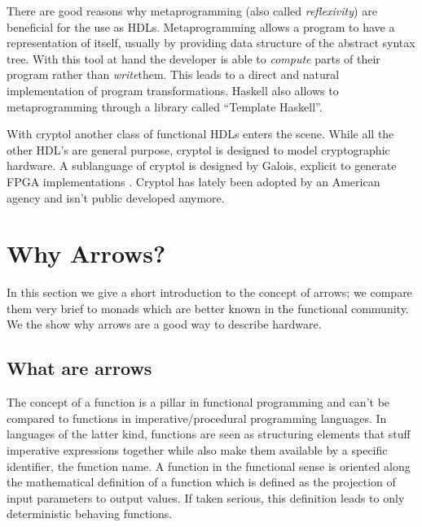 \documentclass{article}
\begin{document}
\par
There are good reasons why metaprogramming (also called \emph{reflexivity}) are beneficial for the use as HDLs. Metaprogramming allows a
program to have a representation of itself, usually by providing data structure of the abstract syntax tree. With this tool at hand the
developer is able to \emph{compute} parts of their program rather than \emph{write}them. This leads to a direct and natural implementation
of program transformations. Haskell also allows to metaprogramming through a library called ``Template Haskell''\cite{haskell:template}. 

\par
With cryptol\cite{cryptol:programming} another class of functional HDLs enters the scene. While all the other HDL's are general purpose,
cryptol is designed to model cryptographic hardware. A sublanguage of cryptol is designed by Galois, explicit to generate FPGA
implementations \cite{cryptol:fpga}. Cryptol has lately been adopted by an American agency and isn't public developed anymore.


\section{Why Arrows?}
In this section we give a short introduction to the concept of arrows; we compare them very brief to monads which are better known in the
functional community. We the show why arrows are a good way to describe hardware. 

\subsection{What are arrows}
The concept of a function is a pillar in functional programming and can't be compared to functions in imperative/procedural programming
languages. In languages of the latter kind, functions are seen as structuring elements that stuff imperative expressions together while also
make them available by a specific identifier, the function name. A function in the functional sense is oriented along the mathematical
definition of a function which is defined as the projection of input parameters to output values. If taken serious, this definition leads
to only deterministic behaving functions.  
\end{document}
